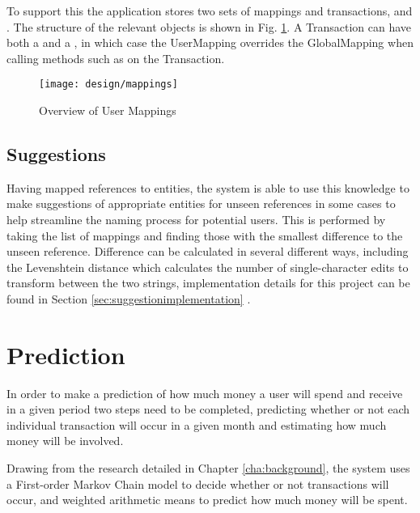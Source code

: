 To support this the application stores two sets of mappings and transactions,  and . The structure of the relevant objects is shown in Fig. \ref{fig:transactormappings}. A Transaction can have both a  and a  , in which case the UserMapping overrides the GlobalMapping when calling methods such as  on the Transaction.

\begin{figure}[h]
    \centering
    \texttt{[image: design/mappings]}
    \caption{Overview of User Mappings}
    \label{fig:transactormappings}
    
    \begin{comment}
[Transaction]<>*-0..1[UserMapping]
[Transaction]<>*-0..1-[GlobalMapping]
[User]<>-*[UserMapping]
[UserMapping]<>*-[UserTransactor]
[UserTransactor]<>*-[Category]
[GlobalTransactor]<>*-[Category]
[GlobalMapping]<>*-[GlobalTransactor]
    \end{comment}
\end{figure}

\subsection{Suggestions}
Having mapped \glspl{reference} to entities, the system is able to use this knowledge to make suggestions of appropriate entities for unseen references in some cases to help streamline the naming process for potential users.
%
This is performed by taking the list of mappings and finding those with the smallest difference to the unseen reference. Difference can be calculated in several different ways, including the Levenshtein distance which calculates the number of single-character edits to transform between the two strings, implementation details for this project can be found in Section \ref{sec:suggestionimplementation} \parencite{levenshtein1966binary}.

\section{Prediction}
In order to make a prediction of how much money a user will spend and receive in a given period two steps need to be completed, predicting whether or not each individual transaction will occur in a given month and estimating how much money will be involved.

Drawing from the research detailed in Chapter \ref{cha:background}, the system uses a First-order Markov Chain model to decide whether or not transactions will occur, and weighted arithmetic means to predict how much money will be spent.

